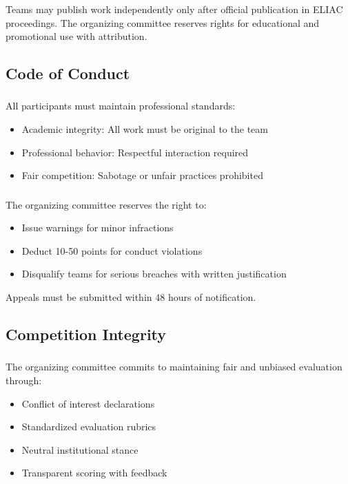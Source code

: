 \subsubsection{}
Teams may publish work independently only after official publication in ELIAC proceedings. The organizing committee reserves rights for educational and promotional use with attribution.

\subsection{Code of Conduct}

\subsubsection{}
All participants must maintain professional standards:
\begin{itemize}[noitemsep]
    \item Academic integrity: All work must be original to the team
    \item Professional behavior: Respectful interaction required
    \item Fair competition: Sabotage or unfair practices prohibited
\end{itemize}

\subsubsection{}
The organizing committee reserves the right to:
\begin{itemize}[noitemsep]
    \item Issue warnings for minor infractions
    \item Deduct 10-50 points for conduct violations
    \item Disqualify teams for serious breaches with written justification
\end{itemize}

Appeals must be submitted within 48 hours of notification.

\subsection{Competition Integrity}

\subsubsection{}
The organizing committee commits to maintaining fair and unbiased evaluation through:
\begin{itemize}[noitemsep]
    \item Conflict of interest declarations
    \item Standardized evaluation rubrics
    \item Neutral institutional stance
    \item Transparent scoring with feedback
\end{itemize}

